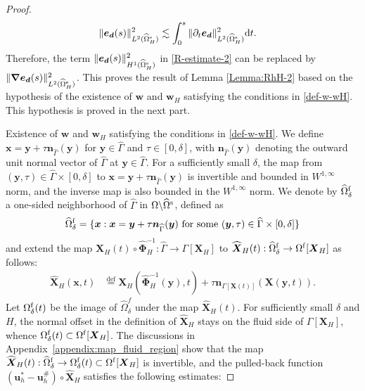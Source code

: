 \documentclass[11pt,reqno]{amsart}
\theoremstyle{definition}
\theoremstyle{plain}
\numberwithin{theorem}{section}
\numberwithin{proposition}{section}
\numberwithin{lemma}{section}
\numberwithin{equation}{section}
\newcommand{\bs}[1]{\boldsymbol{#1}}
\newcommand{\uu}[1]  {{\bs{#1}} }
\newcommand{\dep}{{{\bs{d}}}}
\newcommand{\grad}   { \uu{\nabla}    }
\def\d{\mathrm{d}}
\renewcommand{\(}{\bigl(}
\renewcommand{\)}{\bigr)}
\def\eqd{\stackrel{\mathrm{def}}{=}}
\begin{document}
\begin{proof}
\begin{align*}
&\|{\bs e}_{\bs d}(s)\|_{L^2(\widehat{\Omega}^{\rm s}_H)}^2 
\lesssim \int_0^s \|\partial_t{\bs e}_{\bs d}\|_{L^2(\widehat{\Omega}^{\rm s}_H)}^2 \d t .
\end{align*}  
Therefore, the term $\|{\bs e}_\dep(s)\|_{H^1(\widehat{\Omega}^{\rm s}_H)}^2$ in \eqref{R-estimate-2} can be replaced by $\|\grad{\bs e}_\dep(s)\|_{L^2(\widehat{\Omega}^{\rm s}_H)}^2$. This proves the result of Lemma \ref{Lemma:RhH-2} based on the hypothesis of the existence of ${\bs w}$ and ${\bs w}_H$ satisfying the conditions in \eqref{def-w-wH}. This hypothesis is proved in the next part.\bigskip


 Existence of ${\bs w}$ and ${\bs w}_H$ satisfying the conditions in \eqref{def-w-wH}. We define $\bs x=\bs y+\tau{\bs n}_{\widehat\Gamma}(\bs y)$ for $\bs y\in\widehat\Gamma$ and $\tau\in[0,\delta]$, with ${\bs n}_{\widehat\Gamma}(\bs y)$ denoting the outward unit normal vector of $\widehat\Gamma$ at $\bs y\in\widehat\Gamma$. For a sufficiently small $\delta$, the map from $(\bs y,\tau)\in\widehat\Gamma\times[0,\delta]$ to $\bs x=\bs y+\tau{\bs n}_{\widehat\Gamma}(\bs y)$ is invertible and bounded in $W^{1,\infty}$ norm, and the inverse map is also bounded in the $W^{1,\infty}$ norm. We denote by $\widehat{\Omega}^{\rm f}_\delta$ a one-sided neighborhood of $\widehat\Gamma$ in $\Omega\backslash\widehat{\Omega}^{\rm s}$, defined as  
$$
\widehat{\Omega}^{\rm f}_\delta =\{\bs  x: \bs x= \bs y+\tau{\bs n}_{\widehat\Gamma}(\bs y)\,\,\mbox{for some}\,\, (\bs y,\tau)\in\widehat\Gamma\times[0,\delta] \} 
$$ 
and extend the map ${\bs X}_H(t)\circ\widehat{\bs\Phi}_H^{-1}:\widehat\Gamma\rightarrow\Gamma[{\bs X}_H]$ to $\widehat{\bs X}_H(t):\widehat{\Omega}^{\rm f}_\delta\rightarrow\Omega^{\rm f}[{\bs X}_H]$ as follows: 
\begin{align}\label{def-map-XH}
\widehat{\bs X}_H(\bs x,t)
&\eqd {\bs X}_H(\widehat{\bs\Phi}_H^{-1}(\bs y),t)  + \tau {\bs n}_{\Gamma[{\bs X}(t)]}({\bs X}(\bs y,t)) . 
\end{align}
Let $\Omega^{\rm f}_\delta(t)$ be the image of $\widehat\Omega_\delta^f$ under the map $\widehat{\bs X}_H(t)$. For sufficiently small $\delta$ and $H$, the normal offset in the definition of $\widehat{\bs X}_H$ stays on the fluid side of $\Gamma[{\bs X}_H]$, whence $\Omega^{\rm f}_\delta(t)\subset\Omega^{\rm f}[{\bs X}_H]$. The discussions in Appendix~\ref{appendix:map_fluid_region} show that the map $\widehat{\bs X}_H(t):\widehat{\Omega}^{\rm f}_\delta \rightarrow \Omega^{\rm f}_\delta(t)\subset\Omega^{\rm f}[{\bs X}_H]$ is invertible, and the pulled-back function $({\bs u}_h^*-{\bs u}_h^\#)\circ\widehat{\bs X}_H$ satisfies the following estimates: 

\end{proof}
\end{document}
